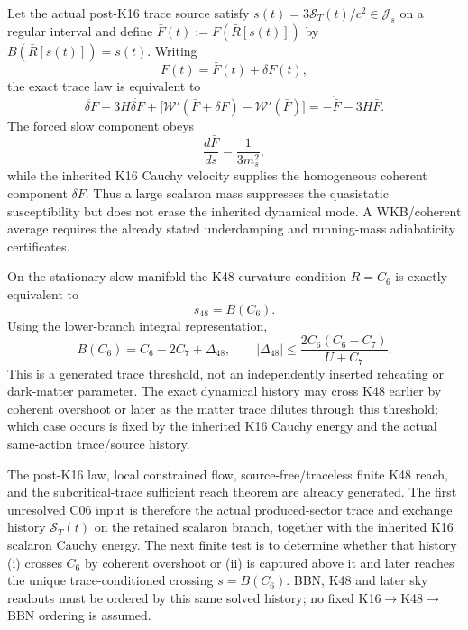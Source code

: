 \documentclass[12pt,a4paper]{article}
\begin{document}
\begin{corollary}
\label{p8:cor:v2175-post16-slow-fast-decomposition}
Let the actual post-K16 trace source satisfy
$s(t)=3\mathcal S_T(t)/c^2\in\mathcal J_s$ on a regular interval and define
\(\bar F(t):=F(\bar R[s(t)])\) by
\(B(\bar R[s(t)])=s(t)\).  Writing
\[
 F(t)=\bar F(t)+\delta F(t),
\]
the exact trace law is equivalent to
\[
 \boxed{
 \ddot{\delta F}+3H\dot{\delta F}
 +\bigl[\mathcal W'(\bar F+\delta F)-\mathcal W'(\bar F)\bigr]
 =-\ddot{\bar F}-3H\dot{\bar F}.}
\]
The forced slow component obeys
\[
 \boxed{\frac{d\bar F}{ds}=\frac{1}{3m_s^2}},
\]
while the inherited K16 Cauchy velocity supplies the homogeneous coherent
component \(\delta F\).  Thus a large scalaron mass suppresses the quasistatic
susceptibility but does not erase the inherited dynamical mode.  A WKB/coherent
average requires the already stated underdamping and running-mass adiabaticity
certificates.
\end{corollary}

\begin{corollary}
\label{p8:cor:v2175-k48-trace-conditioned-crossing}
On the stationary slow manifold the K48 curvature condition \(R=C_6\) is
exactly equivalent to
\[
 \boxed{s_{48}=B(C_6).}
\]
Using the lower-branch integral representation,
\[
 \boxed{B(C_6)=C_6-2C_7+\Delta_{48},\qquad
 |\Delta_{48}|\le\frac{2C_6(C_6-C_7)}{U+C_7}.}
\]
This is a generated trace threshold, not an independently inserted reheating or
dark-matter parameter.  The exact dynamical history may cross K48 earlier by
coherent overshoot or later as the matter trace dilutes through this threshold;
which case occurs is fixed by the inherited K16 Cauchy energy and the actual
same-action trace/source history.
\end{corollary}

\begin{corollary}
\label{p8:cor:v2175-c06-execution-frontier}
The post-K16 law, local constrained flow, source-free/traceless finite K48
reach, and the subcritical-trace sufficient reach theorem are already generated.
The first unresolved C06 input is therefore the actual produced-sector trace
and exchange history \(\mathcal S_T(t)\) on the retained scalaron branch,
together with the inherited K16 scalaron Cauchy energy.  The next finite test is
to determine whether that history (i) crosses \(C_6\) by coherent overshoot or
(ii) is captured above it and later reaches the unique trace-conditioned
crossing \(s=B(C_6)\).  BBN, K48 and later sky readouts must be ordered by this
same solved history; no fixed K16\(\to\)K48\(\to\)BBN ordering is assumed.
\end{corollary}
\end{document}
